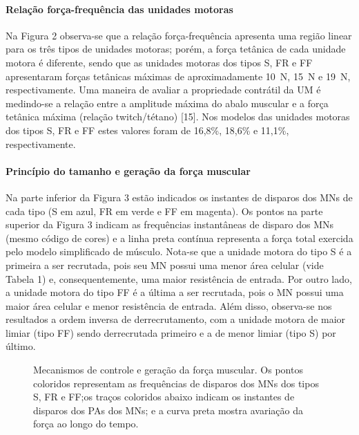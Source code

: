 \paragraph{Relação força-frequência das unidades motoras}
Na Figura 2 observa-se que a relação força-frequência apresenta uma região linear para os três tipos de unidades motoras; porém, a força tetânica de cada unidade motora é diferente, sendo que as unidades motoras dos tipos S, FR e FF apresentaram forças tetânicas máximas de aproximadamente 10 N, 15 N e 19 N, respectivamente. Uma maneira de avaliar a propriedade contrátil da UM é medindo-se a relação entre a amplitude máxima do abalo muscular e a força tetânica máxima (relação twitch/tétano) [15]. Nos modelos das unidades motoras dos tipos S, FR e FF estes valores foram de 16,8\%, 18,6\% e 11,1\%, respectivamente.


\paragraph{Princípio do tamanho e geração da força muscular}
Na parte inferior da Figura 3 estão indicados os instantes de disparos dos MNs de cada tipo (S em azul, FR em verde e FF em magenta). Os pontos na parte superior da Figura 3 indicam as frequências instantâneas de disparo dos MNs (mesmo código de cores) e a linha preta contínua representa a força total exercida pelo modelo simplificado de músculo. Nota-se que a unidade motora do tipo S é a primeira a ser recrutada, pois seu MN possui uma menor área celular (vide Tabela 1) e, consequentemente, uma maior resistência de entrada. Por outro lado, a unidade motora do tipo FF é a última a ser recrutada, pois o MN possui uma maior área celular e menor resistência de entrada. Além disso, observa-se nos resultados a ordem inversa de derrecrutamento, com a unidade motora de maior limiar (tipo FF) sendo derrecrutada primeiro e a de menor limiar (tipo S) por último.

\begin{figure}[h]
  \centering
  \caption{Mecanismos de controle e geração da força muscular. Os pontos coloridos representam as frequências de disparos dos MNs dos tipos S, FR e FF;os traços coloridos abaixo indicam os instantes de disparos dos PAs dos MNs; e a curva preta mostra avariação da força ao longo do tempo.}
  \label{fig:fig3}
\end{figure}

